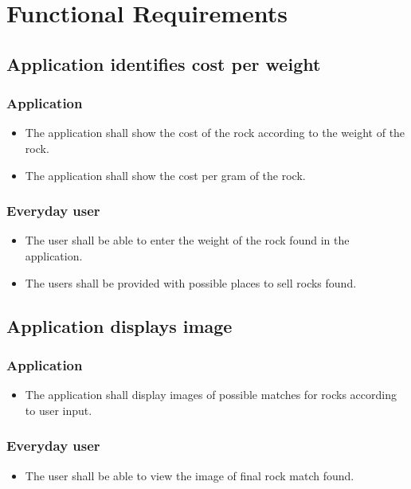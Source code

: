 \documentclass[12pt]{article}
\begin{document}
\vspace{5mm}
\section{Functional Requirements}

\subsection{Application identifies cost per weight }
\subsubsection{Application}
\begin{itemize}

  \item The application shall show the cost of the rock according to the weight of the rock. 
  \item The application shall show the cost per gram of the rock.
  \end{itemize}
  \subsubsection{Everyday user}
  \begin{itemize}
  \item The user shall be able to enter the weight of the rock found in the application.
  \item The users shall be provided with possible places to sell rocks found.
  
\end{itemize}

\subsection{Application displays image}
\subsubsection{Application}
\begin{itemize}
\item The application shall display images of possible matches for rocks according to user input.
\end{itemize}
  \subsubsection{Everyday user}
  \begin{itemize}
  \item The user shall be able to view the image of final rock match found.
\end{itemize}
\end{document}
